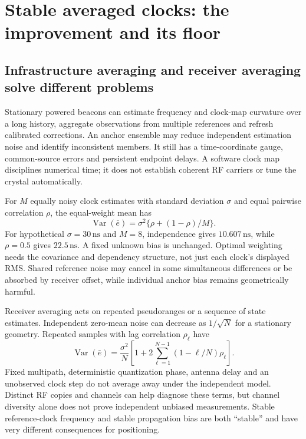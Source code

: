 \documentclass[11pt,letterpaper]{article}
\newcommand{\ns}{\,\mathrm{ns}}\newcommand{\us}{\,\mu\mathrm{s}}\newcommand{\ms}{\,\mathrm{ms}}
\begin{document}
\section{Stable averaged clocks: the improvement and its floor}\label{sec:averaging}
\subsection{Infrastructure averaging and receiver averaging solve different problems}
Stationary powered beacons can estimate frequency and clock-map curvature over a long history, aggregate observations from multiple references and refresh calibrated corrections. An anchor ensemble may reduce independent estimation noise and identify inconsistent members. It still has a time-coordinate gauge, common-source errors and persistent endpoint delays. A software clock map disciplines numerical time; it does not establish coherent RF carriers or tune the crystal automatically.

For $M$ equally noisy clock estimates with standard deviation $\sigma$ and equal pairwise correlation $\rho$, the equal-weight mean has
\begin{equation}
 \operatorname{Var}(\bar e)=\sigma^2\{\rho+(1-\rho)/M\}.\label{eq:ensemble}
\end{equation}
For hypothetical $\sigma=30\ns$ and $M=8$, independence gives $10.607\ns$, while $\rho=0.5$ gives $22.5\ns$. A fixed unknown bias is unchanged. Optimal weighting needs the covariance and dependency structure, not just each clock's displayed RMS. Shared reference noise may cancel in some simultaneous differences or be absorbed by receiver offset, while individual anchor bias remains geometrically harmful.

Receiver averaging acts on repeated pseudoranges or a sequence of state estimates. Independent zero-mean noise can decrease as $1/\sqrt N$ for a stationary geometry. Repeated samples with lag correlation $\rho_\ell$ have
\begin{equation}
 \operatorname{Var}(\bar e)=\frac{\sigma^2}{N}
 \left[1+2\sum_{\ell=1}^{N-1}(1-\ell/N)\rho_\ell\right].\label{eq:timecorr}
\end{equation}
Fixed multipath, deterministic quantization phase, antenna delay and an unobserved clock step do not average away under the independent model. Distinct RF copies and channels can help diagnose these terms, but channel diversity alone does not prove independent unbiased measurements. Stable reference-clock frequency and stable propagation bias are both ``stable'' and have very different consequences for positioning.
\end{document}
